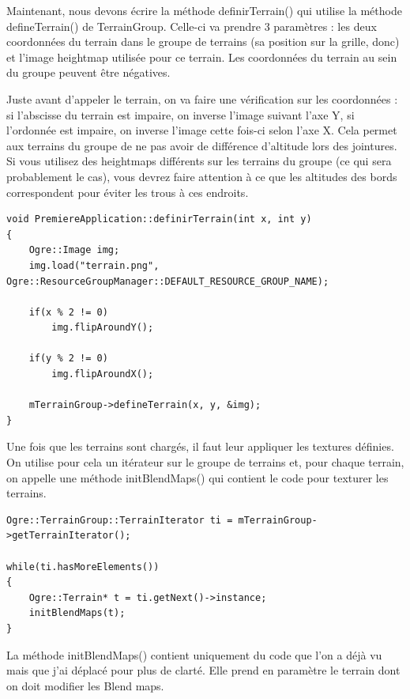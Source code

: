 Maintenant, nous devons écrire la méthode definirTerrain() qui utilise la méthode defineTerrain() de TerrainGroup. Celle-ci va prendre 3 paramètres : les deux coordonnées du terrain dans le groupe de terrains (sa position sur la grille, donc) et l'image heightmap utilisée pour ce terrain. Les coordonnées du terrain au sein du groupe peuvent être négatives.

Juste avant d'appeler le terrain, on va faire une vérification sur les coordonnées : si l'abscisse du terrain est impaire, on inverse l'image suivant l'axe Y, si l'ordonnée est impaire, on inverse l'image cette fois-ci selon l'axe X. Cela permet aux terrains du groupe de ne pas avoir de différence d'altitude lors des jointures. Si vous utilisez des heightmaps différents sur les terrains du groupe (ce qui sera probablement le cas), vous devrez faire attention à ce que les altitudes des bords correspondent pour éviter les trous à ces endroits.

\begin{lstlisting}[caption={PremiereApplication.definirTerrain}]
void PremiereApplication::definirTerrain(int x, int y)
{
    Ogre::Image img;
    img.load("terrain.png", Ogre::ResourceGroupManager::DEFAULT_RESOURCE_GROUP_NAME);

    if(x % 2 != 0)
        img.flipAroundY();

    if(y % 2 != 0)
        img.flipAroundX();

    mTerrainGroup->defineTerrain(x, y, &img);
}
\end{lstlisting}

Une fois que les terrains sont chargés, il faut leur appliquer les textures définies. On utilise pour cela un itérateur sur le groupe de terrains et, pour chaque terrain, on appelle une méthode initBlendMaps() qui contient le code pour texturer les terrains.

\begin{lstlisting}[caption={}]
Ogre::TerrainGroup::TerrainIterator ti = mTerrainGroup->getTerrainIterator();

while(ti.hasMoreElements())
{
    Ogre::Terrain* t = ti.getNext()->instance;
    initBlendMaps(t);
}
\end{lstlisting}

La méthode initBlendMaps() contient uniquement du code que l'on a déjà vu mais que j'ai déplacé pour plus de clarté. Elle prend en paramètre le terrain dont on doit modifier les Blend maps.

